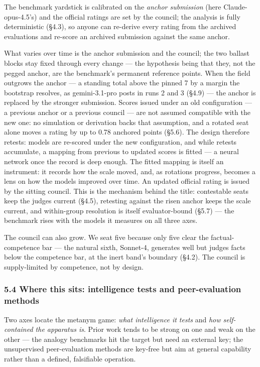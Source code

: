 The benchmark yardstick is calibrated on the \emph{anchor submission} (here Claude-opus-4.5's) and the official ratings are set by the council; the analysis is fully deterministic (§4.3), so anyone can re-derive every rating from the archived evaluations and re-score an archived submission against the same anchor.

What varies over time is the anchor submission and the council; the two ballast blocks stay fixed through every change --- the hypothesis being that they, not the pegged anchor, are the benchmark's permanent reference points. When the field outgrows the anchor --- a standing total above the pinned 7 by a margin the bootstrap resolves, as gemini-3.1-pro posts in runs 2 and 3 (§4.9) --- the anchor is replaced by the stronger submission. Scores issued under an old configuration --- a previous anchor or a previous council --- are not assumed compatible with the new one: no simulation or derivation backs that assumption, and a rotated seat alone moves a rating by up to 0.78 anchored points (§5.6). The design therefore retests: models are re-scored under the new configuration, and while retests accumulate, a mapping from previous to updated scores is fitted --- a neural network once the record is deep enough. The fitted mapping is itself an instrument: it records how the scale moved, and, as rotations progress, becomes a lens on how the models improved over time. An updated official rating is issued by the sitting council. This is the mechanism behind the title: contestable seats keep the judges current (§4.5), retesting against the risen anchor keeps the scale current, and within-group resolution is itself evaluator-bound (§5.7) --- the benchmark rises with the models it measures on all three axes.

The council can also grow. We seat five because only five clear the factual-competence bar --- the natural sixth, Sonnet-4, generates well but judges facts below the competence bar, at the inert band's boundary (§4.2). The council is supply-limited by competence, not by design.

\subsubsection{5.4 Where this sits: intelligence tests and peer-evaluation methods}\label{where-this-sits-intelligence-tests-and-peer-evaluation-methods}

Two axes locate the metanym game: \emph{what intelligence it tests} and \emph{how self-contained the apparatus is}. Prior work tends to be strong on one and weak on the other --- the analogy benchmarks hit the target but need an external key; the unsupervised peer-evaluation methods are key-free but aim at general capability rather than a defined, falsifiable operation.

